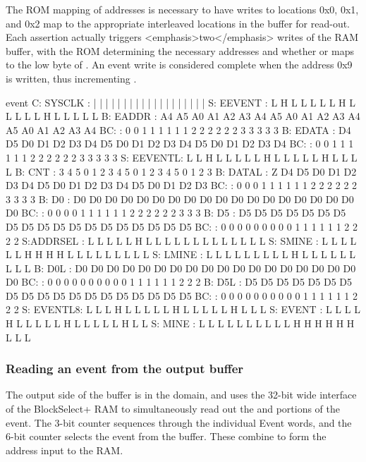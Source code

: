 The ROM mapping of addresses is necessary to have writes to locations
0x0, 0x1, and 0x2 map to the appropriate interleaved locations in the
buffer for read-out.  Each  assertion actually
triggers <emphasis>two</emphasis> writes of the RAM buffer, with the
ROM determining the necessary addresses and whether
 or  maps to the
low byte of . An event write is considered
complete when the address 0x9 is written, thus incrementing
.
        
\begin{timing}{event}
C: SYSCLK :  |  |  |  |  |  |  |  |  |  |  |  |  |  |  |  |  |  |  | 
S: EEVENT :  L  H  L  L  L  L  L  H  L  L  L  L  L  H  L  L  L  L  L
B: EADDR  :  A4 A5 A0 A1 A2 A3 A4 A5 A0 A1 A2 A3 A4 A5 A0 A1 A2 A3 A4
BC:       :  0  0  1  1  1  1  1  1  2  2  2  2  2  2  3  3  3  3  3 
B: EDATA  :  D4 D5 D0 D1 D2 D3 D4 D5 D0 D1 D2 D3 D4 D5 D0 D1 D2 D3 D4
BC:       :  0  0  1  1  1  1  1  1  2  2  2  2  2  2  3  3  3  3  3 
S: EEVENTL:  L  L  H  L  L  L  L  L  H  L  L  L  L  L  H  L  L  L  L
B: CNT    :  3  4  5  0  1  2  3  4  5  0  1  2  3  4  5  0  1  2  3
B: DATAL  :  Z  D4 D5 D0 D1 D2 D3 D4 D5 D0 D1 D2 D3 D4 D5 D0 D1 D2 D3
BC:       :  0  0  0  1  1  1  1  1  1  2  2  2  2  2  2  3  3  3  3
B: D0     :  D0 D0 D0 D0 D0 D0 D0 D0 D0 D0 D0 D0 D0 D0 D0 D0 D0 D0 D0
BC:       :  0  0  0  0  1  1  1  1  1  1  2  2  2  2  2  2  3  3  3
B: D5     :  D5 D5 D5 D5 D5 D5 D5 D5 D5 D5 D5 D5 D5 D5 D5 D5 D5 D5 D5
BC:       :  0  0  0  0  0  0  0  0  0  1  1  1  1  1  1  2  2  2  2
S:ADDRSEL :  L  L  L  L  L  H  L  L  L  L  L  L  L  L  L  L  L  L  L 
S: SMINE  :  L  L  L  L  L  L  H  H  H  H  L  L  L  L  L  L  L  L  L 
S: LMINE  :  L  L  L  L  L  L  L  L  L  H  L  L  L  L  L  L  L  L  L
B:   D0L  :  D0 D0 D0 D0 D0 D0 D0 D0 D0 D0 D0 D0 D0 D0 D0 D0 D0 D0 D0
BC:       :  0  0  0  0  0  0  0  0  0  0  1  1  1  1  1  1  2  2  2
B: D5L    :  D5 D5 D5 D5 D5 D5 D5 D5 D5 D5 D5 D5 D5 D5 D5 D5 D5 D5 D5
BC:       :  0  0  0  0  0  0  0  0  0  0  1  1  1  1  1  1  2  2  2
S: EVENTL8:  L  L  L  H  L  L  L  L  L  H  L  L  L  L  L  H  L  L  L
S: EVENT  :  L  L  L  L  H  L  L  L  L  L  H  L  L  L  L  L  H  L  L  
S: MINE   :  L  L  L  L  L  L  L  L  L  L  H  H  H  H  H  H  L  L  L
\end{timing}
                
\subsubsection{Reading an event from the output buffer}
The output side of the buffer is in the 
domain, and uses the 32-bit wide interface of the BlockSelect+ RAM to
simultaneously read out the  and
 portions of the event. The 3-bit
 counter sequences through the individual
Event words, and the 6-bit  counter
selects the event from the buffer. These combine to form the address
input  to the RAM.
   
